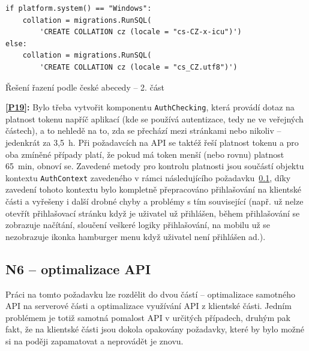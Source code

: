 \begin{listing}[ht]
	\begin{verbatim}
if platform.system() == "Windows":
    collation = migrations.RunSQL(
        'CREATE COLLATION cz (locale = "cs-CZ-x-icu")')
else:
    collation = migrations.RunSQL(
        'CREATE COLLATION cz (locale = "cs_CZ.utf8")')
	\end{verbatim}
	\caption{Řešení řazení podle české abecedy -- 2. část}\label{lst:razeni2}
\end{listing}

\textbf{\ref{P19}:} Bylo třeba vytvořit komponentu \verb|AuthChecking|, která provádí dotaz na platnost tokenu napříč aplikací (kde se používá autentizace, tedy ne ve veřejných částech), a to nehledě na to, zda se přechází mezi stránkami nebo nikoliv -- jedenkrát za 3,5~h. Při požadavcích na API se taktéž řeší platnost tokenu a pro oba zmíněné případy platí, že pokud má token menší (nebo rovnu) platnost 65~min, obnoví se. Zavedené metody pro kontrolu platnosti jsou součástí objektu kontextu \verb|AuthContext| zavedeného v rámci následujícího požadavku~\ref{subsec:N6implementace}, díky zavedení tohoto kontextu bylo kompletně přepracováno přihlašování na klientské části a vyřešeny i další drobné chyby a problémy s tím související (např. už nelze otevřít přihlašovací stránku když je uživatel už přihlášen, během přihlašování se zobrazuje načítání, sloučení veškeré logiky přihlašování, na mobilu už se nezobrazuje ikonka hamburger menu když uživatel není přihlášen ad.).

\subsection{N6 -- optimalizace API}\label{subsec:N6implementace}

Práci na tomto požadavku lze rozdělit do dvou částí -- optimalizace samotného API na serverové části a optimalizace využívání API z klientské části. Jedním problémem je totiž samotná pomalost API v určitých případech, druhým pak fakt, že na klientské části jsou dokola opakovány požadavky, které by bylo možné si na poději zapamatovat a neprovádět je znovu.

